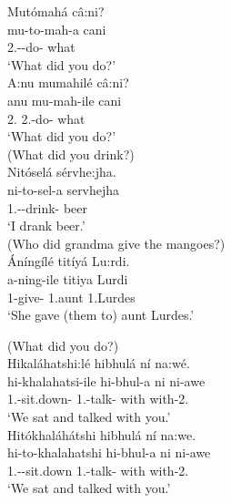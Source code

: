 \documentclass[output=paper]{langscibook}
\begin{document}
\ea\label{bkm:Ref127267469}
\ea
Mutómahá câ:ni?\\
\gll
mu-to-mah-a  cani\\
2\PL.\SM{}-\TO{}-do-\FV{}  what\\
\glt
‘What did you do?’\\


\ex
A:nu mumahilé câ:ni?\\
\gll
anu  mu-mah-ile  cani\\
2\PL{}.\PRO{}  2\PL.\SM{}-do-\PFV{}  what\\
\glt
‘What did you do?’\\

\z
\z
\pagebreak
\ea\label{bkm:Ref127267478}
\ea
(What did you drink?)\\
Nitóselá sérvhe:jha.\\
\gll
ni-to-sel-a  servhejha\\
1\SG.\SM{}-\TO{}-drink-\FV{}  beer\\
\glt
‘I drank beer.’\\


\ex
(Who did grandma give the mangoes?)\\
Áníngílé titíyá Lu:rdi.\\
\gll
a-ning-ile  titiya  Lurdi\\
1\SM{}-give-\PFV{}  1.aunt  1.Lurdes\\
\glt
‘She gave (them to) aunt Lurdes.’\\

\z
\z

\ea
\label{bkm:Ref127267501}
(What did you do?)\\
\ea
Hikaláhatshi:lé hibhulá ní na:wé.\\
\gll
hi-khalahatsi-ile  hi-bhul-a  ni  ni-awe\\
1\PL.\SM{}-sit.down-\PFV{}  1\PL.\SM{}-talk-\FV{}  with  with-2\SG{}.\PRO{}\\
\glt
‘We sat and talked with you.’\\


\ex
Hitókhaláhátshi hibhulá ní na:we.\\
\gll
hi-to-khalahatshi  hi-bhul-a  ni  ni-awe\\
1\PL.\SM{}-\TO{}-sit.down  1\PL.\SM{}-talk-\FV{}  with  with-2\SG{}.\PRO{}\\
\glt
‘We sat and talked with you.’\\
\end{document}
